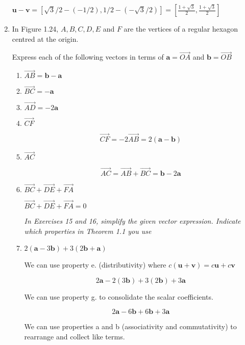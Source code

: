 \documentclass{article}
\begin{document}
\begin{enumerate}
		$\boldsymbol{u} - \boldsymbol{v} = [\sqrt{3}/2 - (-1/2), 1/2 - (-\sqrt{3}/2 )] = [\frac{1+\sqrt{3}}{2}, \frac{1+\sqrt{3}}{2}]$

		\item In Figure 1.24, $A,B,C,D,E$ and $F$ are the vertices of a regular hexagon centred at the origin.

			Express each of the following vectors in terms of $\boldsymbol{a} = \vec{OA}$ and $\boldsymbol{b} = \vec{OB}$

		\begin{enumerate}

			\item $\vec{AB} = \boldsymbol{b}-\boldsymbol{a}$

			\item $\vec{BC} = -\boldsymbol{a}$

			\item $\vec{AD} = -2\boldsymbol{a}$

			\item $\vec{CF}$

				$$\vec{CF} = -2\vec{AB} = 2(\boldsymbol{a} - \boldsymbol{b})$$

			\item $\vec{AC}$

				$$\vec{AC} = \vec{AB} + \vec{BC} = \boldsymbol{b} - 2\boldsymbol{a}$$

			\item $\vec{BC} + \vec{DE} + \vec{FA}$

				$\vec{BC} + \vec{DE} + \vec{FA} = 0$

			\emph{In Exercises 15 and 16, simplify the given vector expression.
				Indicate which properties in Theorem 1.1 you use}

			\item $2(\boldsymbol{a} - 3\boldsymbol{b}) + 3(2\boldsymbol{b} + \boldsymbol{a})$

				We can use property e. (distributivity) where $c(\boldsymbol{u} + \boldsymbol{v}) =
				c\boldsymbol{u} + c\boldsymbol{v}$

				$$2\boldsymbol{a} - 2(3\boldsymbol{b}) + 3(2\boldsymbol{b}) + 3\boldsymbol{a}$$

				We can use property g. to consolidate the scalar coefficients.

				$$2\boldsymbol{a} - 6\boldsymbol{b} + 6\boldsymbol{b} + 3\boldsymbol{a}$$

				We can use properties a and b (associativity and commutativity) to rearrange and
				collect like terms.


\end{enumerate}
\end{enumerate}
\end{document}
